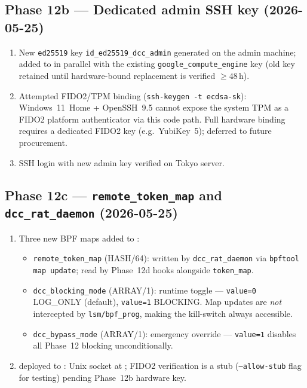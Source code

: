 \documentclass[11pt,a4paper]{article}
\theoremstyle{definition}
\begin{document}
\subsection*{Phase 12b — Dedicated admin SSH key (2026-05-25)}

\begin{enumerate}[noitemsep]
  \item New \texttt{ed25519} key \texttt{id\_ed25519\_dcc\_admin} generated
        on the admin machine; added to  in parallel
        with the existing \texttt{google\_compute\_engine} key (old key
        retained until hardware-bound replacement is verified $\geq 48$\,h).
  \item Attempted FIDO2/TPM binding (\texttt{ssh-keygen -t ecdsa-sk}):
        Windows~11~Home + OpenSSH~9.5 cannot expose the system TPM
        as a FIDO2 platform authenticator via this code path.
        Full hardware binding requires a dedicated FIDO2 key
        (e.g.\ YubiKey~5); deferred to future procurement.
  \item SSH login with new admin key verified on Tokyo server.
\end{enumerate}

\subsection*{Phase 12c — \texttt{remote\_token\_map} and \texttt{dcc\_rat\_daemon} (2026-05-25)}

\begin{enumerate}[noitemsep]
  \item Three new BPF maps added to :
    \begin{itemize}[noitemsep]
      \item \texttt{remote\_token\_map} (HASH/64): written by
            \texttt{dcc\_rat\_daemon} via \texttt{bpftool map update};
            read by Phase~12d hooks alongside \texttt{token\_map}.
      \item \texttt{dcc\_blocking\_mode} (ARRAY/1): runtime toggle —
            \texttt{value=0} LOG\_ONLY (default), \texttt{value=1} BLOCKING.
            Map updates are \emph{not} intercepted by \texttt{lsm/bpf\_prog},
            making the kill-switch always accessible.
      \item \texttt{dcc\_bypass\_mode} (ARRAY/1): emergency override —
            \texttt{value=1} disables all Phase~12 blocking unconditionally.
    \end{itemize}
  \item {} deployed to
        : Unix socket at
        ; FIDO2 verification is a stub
        (\texttt{--allow-stub} flag for testing) pending Phase~12b hardware key.
\end{enumerate}
\end{document}
